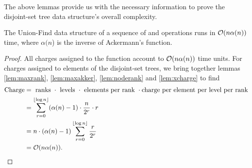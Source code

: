 The above lemmas provide us with the necessary information to prove the disjoint-set tree data structure's overall complexity. 
\begin{theorem}\label{the:ufcomplexity}
  The Union-Find data structure of a sequence of  and  operations runs in $\mathcal{O}(n\alpha(n))$ time, where $\alpha(n$) is the inverse of Ackermann's function.
\end{theorem}
\begin{proof}
  All charges assigned to the  function account to $\mathcal{O}(n\alpha(n))$ time units. For charges assigned to elements of the disjoint-set trees, we bring together lemmas \ref{lem:maxrank}, \ref{lem:maxakker}, \ref{lem:noderank} and \ref{lem:xcharge} to find 
  \begin{align*}
    \text{Charge} &= \text{ ranks } \cdot \text{ levels } \cdot \text{ elements per rank } \cdot \text{charge per element per level per rank}\\
    &= \sum_{r=0}^{\lfloor \log n \rfloor} (\alpha(n)-1)\cdot \frac{n}{2^r}\cdot r\\
    &= n\cdot (\alpha(n)-1)\sum_{r=0}^{\lfloor \log n \rfloor}\frac{r}{2^r} \\
    &= \mathcal{O}(n\alpha(n)).
  \end{align*}
\end{proof}